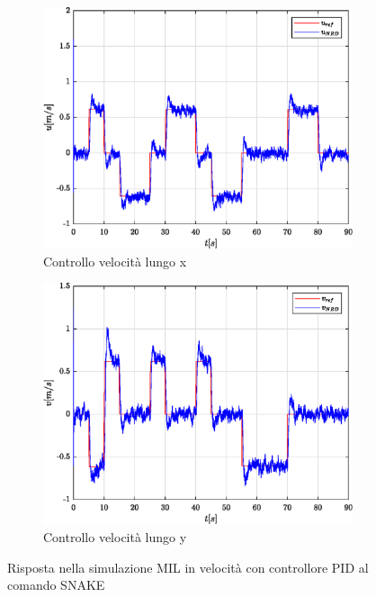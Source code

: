 \begin{figure}
	\centering
	\begin{subfigure}{0.45\textwidth}
		\centering
		\includegraphics[width=1\textwidth]{Simulazioni/Figure/PID/SNAKE_MIL/PositionControlXVel}
		\caption{Controllo velocità lungo x}
		\label{fig:SNAKEerrvelxPID_MIL}
	\end{subfigure}
	\hfill
	\begin{subfigure}{0.45\textwidth}
		\centering
		\includegraphics[width=1\textwidth]{Simulazioni/Figure/PID/SNAKE_MIL/PositionControlYVel}
		\caption{Controllo velocità lungo y}
		\label{fig:SNAKEerrvelyPID_MIL}
	\end{subfigure}
	\caption{Risposta nella simulazione MIL in velocità con controllore PID al comando SNAKE}
\end{figure}


